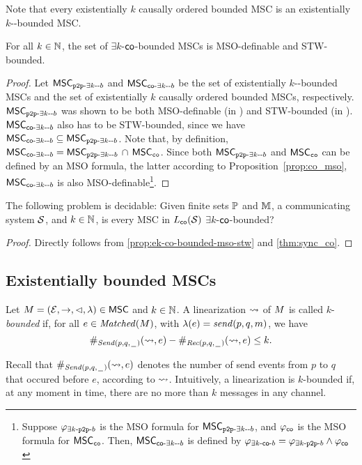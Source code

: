 Note that every existentially $k$ causally ordered bounded MSC is an existentially $k$-\pp-bounded MSC.

\begin{proposition}\label{prop:ek-co-bounded-mso-stw}
For all $k \in \mathbb{N}$, the set of $\exists k$-$\mathsf{co}$-bounded MSCs is MSO-definable and STW-bounded.
\end{proposition}
\begin{proof}
Let $\mathsf{MSC}_{\mathtt{p2p}\text{-}\exists k\text{-}\text{-}b}$ and $\mathsf{MSC}_{\mathsf{co}\text{-}\exists k\text{-}\text{-}b}$ be the set of existentially $k$-\pp-bounded MSCs and the set of existentially $k$ causally ordered bounded MSCs, respectively. $\mathsf{MSC}_{\mathtt{p2p}\text{-}\exists k\text{-}\text{-}b}$ was shown to be both MSO-definable (in \cite{DBLP:journals/iandc/LohreyM04}) and STW-bounded (in \cite[Proposition 5.4, page 163]{DBLP:journals/corr/abs-1904-06942}). $\mathsf{MSC}_{\mathsf{co}\text{-}\exists k\text{-}\text{-}b}$ also has to be STW-bounded, since we have $\mathsf{MSC}_{\mathsf{co}\text{-}\exists k\text{-}\text{-}b} \subseteq \mathsf{MSC}_{\mathtt{p2p}\text{-}\exists k\text{-}\text{-}b}$. Note that, by definition, $\mathsf{MSC}_{\mathsf{co}\text{-}\exists k\text{-}\text{-}b} = \mathsf{MSC}_{\mathtt{p2p}\text{-}\exists k\text{-}\text{-}b}\, \cap\, \mathsf{MSC}_{\mathtt{co}}$. Since both $\mathsf{MSC}_{\mathtt{p2p}\text{-}\exists k\text{-}\text{-}b}$ and $\mathsf{MSC}_{\mathtt{co}}$ can be defined by an MSO formula, the latter according to Proposition~\ref{prop:co_mso}, $\mathsf{MSC}_{\mathsf{co}\text{-}\exists k\text{-}\text{-}b}$ is also MSO-definable\footnote{Suppose $\varphi_{\exists k\text{-}\mathtt{p2p}\text{-}b}$ is the MSO formula for $\mathsf{MSC}_{\mathtt{p2p}\text{-}\exists k\text{-}\text{-}b}$, and $\varphi_{\mathsf{co}}$ is the MSO formula for $\mathsf{MSC}_{\mathtt{co}}$. Then, $\mathsf{MSC}_{\mathsf{co}\text{-}\exists k\text{-}\text{-}b}$ is defined by $\varphi_{\exists k\text{-}\mathsf{co}\text{-}b} = \varphi_{\exists k\text{-}\mathtt{p2p}\text{-}b} \wedge \varphi_{\mathsf{co}}$}.
\end{proof}

\begin{theorem}\label{thm:sync_ek_co_bounded}
	The following problem is decidable: Given finite sets $\mathbb{P}$ and $\mathbb{M}$, a communicating system $\mathcal{S}$, and $k \in \mathbb{N}$, is every MSC in $L_{\mathsf{co}}(\mathcal{S})$ $\exists k$-$\mathsf{co}$-bounded?
\end{theorem}
\begin{proof}
	Directly follows from \ref{prop:ek-co-bounded-mso-stw} and \ref{thm:sync_co}.
\end{proof}

\subsection{Existentially bounded MSCs}

\begin{definition}\label{def:lin_k_bounded}
	Let $M = (\mathcal{E},\to,\lhd,\lambda) \in \mathsf{MSC}$ and $k \in \mathbb{N}$.
	A linearization $\rightsquigarrow$ of $M$ is called
	$k$-\emph{bounded} if, for all $e \in \mathit{Matched}(M)$, with $\lambda(e) = \mathit{send}(p, q, m)$, we have
	\[
	\#_{{\mathit{Send}(p,q,\hspace{0.1em}\underline{\hspace{0.5em}}\hspace{0.1em})}}(\rightsquigarrow,e) - \#_{{\mathit{Rec}(p,q,\hspace{0.1em}\underline{\hspace{0.5em}}\hspace{0.1em})}}(\rightsquigarrow,e) \le k.
	\]
\end{definition}
\noindent Recall that $\#_{{\mathit{Send}(p,q,\hspace{0.1em}\underline{\hspace{0.5em}}\hspace{0.1em})}}(\rightsquigarrow,e)$ denotes the number of send events from $p$ to $q$ that occured before $e$, according to $\rightsquigarrow$. Intuitively, a linearization is $k$-bounded if, at any moment in time, there are no more than $k$ messages in any channel.

